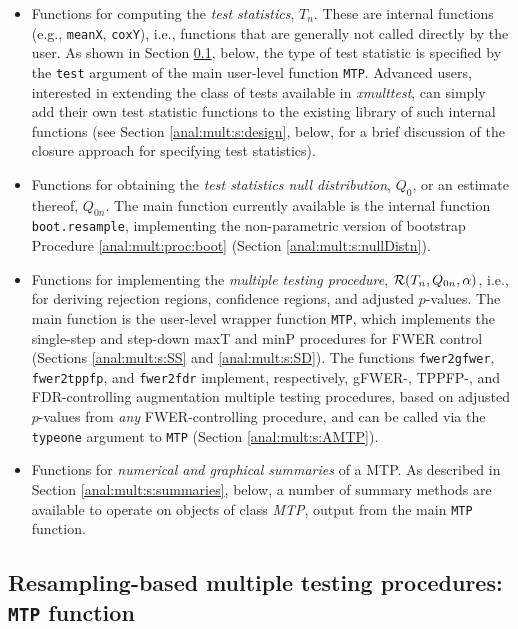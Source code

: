 \documentclass[11pt]{article}
\newcommand{\Rpackage}[1]{\textit{#1}}
\newcommand{\Robject}[1]{\texttt{#1}}
\newcommand{\Rclass}[1]{\textit{#1}}
\begin{document}
\begin{itemize}

\item 
Functions for computing the {\em test statistics}, $T_n$. These are internal functions (e.g., \Robject{meanX}, \Robject{coxY}), i.e., functions that are generally not called directly by the user. 
As shown in Section \ref{anal:mult:s:MTP}, below, the type of test statistic is specified by the \Robject{test} argument of the main user-level function \Robject{MTP}.  
Advanced users, interested in extending the class of tests available in \Rpackage{xmulttest}, can simply add their own test statistic functions to the existing library of such internal functions (see Section \ref{anal:mult:s:design}, below, for a brief discussion of the closure approach for specifying test statistics).

\item
Functions for obtaining the {\em test statistics null distribution}, $Q_0$, or an estimate thereof, $Q_{0n}$.  The main function currently available is the internal function \Robject{boot.resample}, implementing the non-parametric version of bootstrap Procedure \ref{anal:mult:proc:boot} (Section \ref{anal:mult:s:nullDistn}). 

\item
Functions for implementing the {\em multiple testing procedure}, ${\cal R}(T_n, Q_{0n},\alpha)$, i.e., for deriving rejection regions, confidence regions, and adjusted $p$-values. 
The main function is the  user-level wrapper function \Robject{MTP}, which implements the single-step and step-down maxT and minP procedures for FWER control (Sections \ref{anal:mult:s:SS} and \ref{anal:mult:s:SD}). 
The functions \Robject{fwer2gfwer}, \Robject{fwer2tppfp}, and \Robject{fwer2fdr} implement, respectively, gFWER-, TPPFP-, and FDR-controlling augmentation multiple testing procedures, based on adjusted $p$-values from {\em any} FWER-controlling procedure, and can be called via the \Robject{typeone} argument to \Robject{MTP} (Section \ref{anal:mult:s:AMTP}). 

\item
Functions for {\em numerical and graphical summaries} of a MTP. As described in Section \ref{anal:mult:s:summaries}, below, a number of summary methods are available to operate on objects of class \Rclass{MTP}, output from the main \Robject{MTP} function.
\end{itemize}

\subsection{Resampling-based multiple testing procedures: \Robject{MTP} function}
\label{anal:mult:s:MTP}
\end{document}
